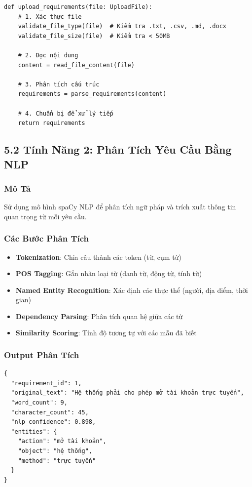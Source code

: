 \documentclass[14pt,a4paper]{article}
\begin{document}
\begin{lstlisting}
def upload_requirements(file: UploadFile):
    # 1. Xác thực file
    validate_file_type(file)  # Kiểm tra .txt, .csv, .md, .docx
    validate_file_size(file)  # Kiểm tra < 50MB
    
    # 2. Đọc nội dung
    content = read_file_content(file)
    
    # 3. Phân tích cấu trúc
    requirements = parse_requirements(content)
    
    # 4. Chuẩn bị để xử lý tiếp
    return requirements
\end{lstlisting}

\subsection{5.2 Tính Năng 2: Phân Tích Yêu Cầu Bằng NLP}

\subsubsection{Mô Tả}
Sử dụng mô hình spaCy NLP để phân tích ngữ pháp và trích xuất thông tin quan trọng 
từ mỗi yêu cầu.

\subsubsection{Các Bước Phân Tích}

\begin{itemize}
    \item \textbf{Tokenization}: Chia câu thành các token (từ, cụm từ)
    \item \textbf{POS Tagging}: Gắn nhãn loại từ (danh từ, động từ, tính từ)
    \item \textbf{Named Entity Recognition}: Xác định các thực thể (người, địa điểm, thời gian)
    \item \textbf{Dependency Parsing}: Phân tích quan hệ giữa các từ
    \item \textbf{Similarity Scoring}: Tính độ tương tự với các mẫu đã biết
\end{itemize}

\subsubsection{Output Phân Tích}

\begin{lstlisting}
{
  "requirement_id": 1,
  "original_text": "Hệ thống phải cho phép mở tài khoản trực tuyến",
  "word_count": 9,
  "character_count": 45,
  "nlp_confidence": 0.898,
  "entities": {
    "action": "mở tài khoản",
    "object": "hệ thống",
    "method": "trực tuyến"
  }
}
\end{lstlisting}
\end{document}
